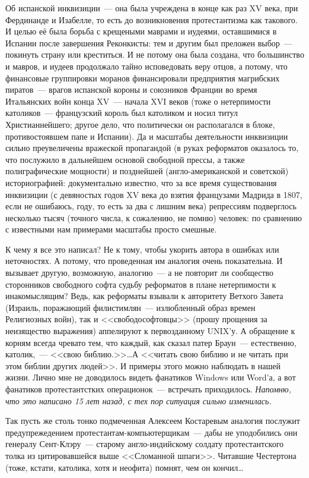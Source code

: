 Об испанской инквизиции~--- она была учреждена в конце как раз XV века, при Фердинанде и Изабелле, то есть до возникновения протестантизма как такового. И целью её была борьба с крещеными маврами и иудеями, оставшимися в Испании после завершения Реконкисты: тем и другим был преложен выбор~--- покинуть страну или креститься. И не потому она была создана, что большинство и мавров, и иудеев продолжало тайно исповедовать веру отцов, а потому, что финансовые группировки моранов финансировали предприятия магрибских пиратов~--- врагов испанской короны и союзников Франции во время Итальянских войн конца XV~--- начала XVI веков (тоже о нетерпимости католиков~--- французский король был католиком и носил титул Христианнейшего; другое дело, что политически он располагался в блоке, противостоявшем папе и Испании). Да и масштабы деятельности инквизиции сильно преувеличены вражеской пропагандой (в руках реформатов оказалось то, что послужило в дальнейшем основой свободной прессы, а также полиграфические мощности) и позднейшей (англо-американской и советской) историографией: документально известно, что за все время существования инквизиции (с девяностых годов XV века до взятия французами Мадрида в 1807, если не ошибаюсь, году, то есть за два с лишним века) репрессиям подверглось несколько тысяч (точного числа, к сожалению, не помню) человек: по сравнению с известными нам примерами масштабы просто смешные. 

К чему я все это написал? Не к тому, чтобы укорить автора в ошибках или неточностях. А потому, что проведенная им аналогия очень показательна. И вызывает другую, возможную, аналогию~--- а не повторит ли сообщество сторонников свободного софта судьбу реформатов в плане нетерпимости к инакомыслящим? Ведь, как реформаты взывали к авторитету Ветхого Завета (Израиль, поражающий филистимлян~--- излюбленный образ времен Религиозных войн), так и <<свободософтовцы>> (прошу прощения за неизящество выражения) аппелируют к первозданному UNIX'у. А обращение к корням всегда чревато тем, что каждый, как сказал патер Браун~--- естественно, католик,~--- << свою библию.>>\dots А << читать свою библию и не читать при этом библии других людей>>. И примеры этого можно наблюдать в нашей жизни. Лично мне не доводилось видеть фанатиков Windows или Word'а, а вот фанатиков протестантстких операционок~--- встречать приходилось. 
\textit{Напомню, что это написано 15 лет назад, с тех пор ситуация сильно изменилась.}


Так пусть же столь тонко подмеченная Алексеем Костаревым аналогия послужит предупрежедением протестантам-компьютерщикам~--- дабы не уподобились они генералу Сент-Клэру~--- старому англо-индийскому солдату протестантского толка из цитировавшейся выше <<Сломанной шпаги>>. Читавшие Честертона (тоже, кстати, католика, хотя и неофита) помнят, чем он кончил\dots 

